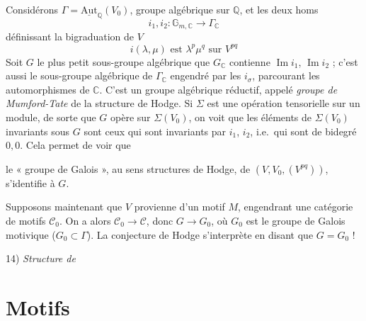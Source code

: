 \documentclass[11pt,a4paper]{article}
\begin{document}
Considérons $\Gamma = \underline{\mathrm{Aut}}_{\mathbb{Q}}(V_{0})$, groupe
algébrique sur $\mathbb{Q}$, et les deux homs
\[
  i_{1}, i_{2} : \mathbb{G}_{m,\mathbb{C}} \longrightarrow \Gamma_{\mathbb{C}}
\]
définissant la bigraduation de $V$
\[
  i(\lambda, \mu) \text{ est } \lambda^{p}\mu^{q} \text{ sur } V^{pq}
\]
Soit $G$ le plus petit sous-groupe algébrique 
 que $G_{\mathbb{C}}$ contienne $\operatorname{Im} i_{1}$,
$\operatorname{Im} i_{2}$ ;  c'est aussi le sous-groupe
algébrique de $\Gamma_{\mathbb{C}}$ engendré par les $i_{\sigma}$,
\uncertain{$\sigma$} parcourant les \struck{\ill{}} automorphismes de
$\mathbb{C}$. C'est un groupe algébrique réductif, appelé \emph{groupe de
Mumford-Tate} de la structure de Hodge.
Si $\Sigma$ est une opération tensorielle sur un module, de sorte que $G$
opère sur $\Sigma(V_{0})$, on voit que les éléments de $\Sigma(V_{0})$
invariants sous $G$  sont ceux qui sont invariants par
 $i_{1}$, $i_{2}$, i.e.\ qui sont de bidegré $0,0$. Cela
permet de voir que

le « groupe de Galois », au sens structures de Hodge, de
$(V, V_{0}, (V^{pq}))$, s'identifie à $G$.

Supposons maintenant que $V$ provienne d'un motif $M$, engendrant une
\marginal{$\otimes$-}catégorie de motifs $\mathcal{C}_{0}$. On a alors
$\mathcal{C}_{0} \to \mathcal{C}$, donc $G \to G_{0}$, où $G_{0}$ est le
groupe de Galois motivique ($G_{0} \subset \Gamma$). La conjecture de Hodge
s'interprète en disant que \emph{$G = G_{0}$} !

14) \emph{Structure de }

\section{Motifs}
\end{document}
